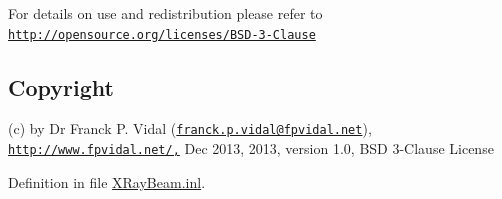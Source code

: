 For details on use and redistribution please refer to \href{http://opensource.org/licenses/BSD-3-Clause}{\tt http://opensource.org/licenses/BSD-\/3-\/Clause}\hypertarget{_x_ray_renderer_8inl_Copyright}{}\subsection{Copyright}\label{_x_ray_renderer_8inl_Copyright}
(c) by Dr Franck P. Vidal (\href{mailto:franck.p.vidal@fpvidal.net}{\tt franck.p.vidal@fpvidal.net}), \href{http://www.fpvidal.net/,}{\tt http://www.fpvidal.net/,} Dec 2013, 2013, version 1.0, BSD 3-\/Clause License 

Definition in file \hyperlink{_x_ray_beam_8inl_source}{XRayBeam.inl}.

